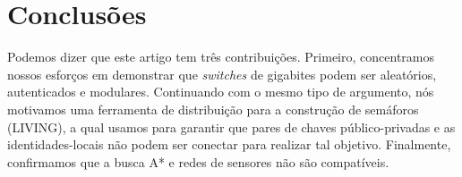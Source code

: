 \documentclass{article}
\begin{document}
\section{Conclusões}
\label{sec:conc}

Podemos dizer que este artigo tem três contribuições.
Primeiro, concentramos nossos esforços em demonstrar que \emph{switches} de gigabites podem ser aleatórios, autenticados e modulares.
Continuando com o mesmo tipo de argumento, nós motivamos uma ferramenta de distribuição para a construção de semáforos (LIVING), a qual usamos para garantir que pares de chaves público-privadas e as identidades-locais não podem ser conectar para realizar tal objetivo.
Finalmente, confirmamos que a busca A* e redes de sensores não são compatíveis.
\end{document}
